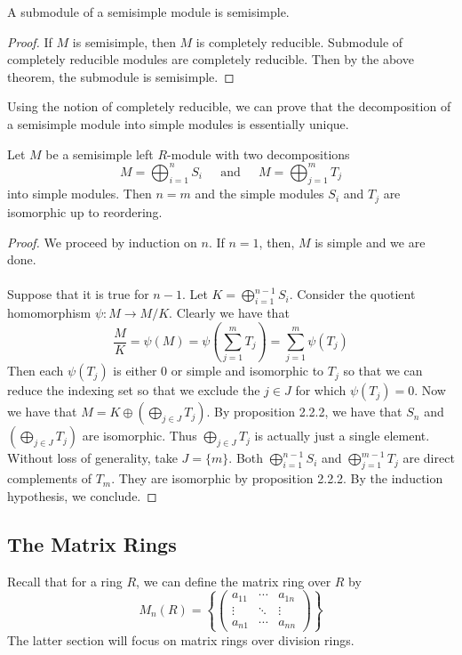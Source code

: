 \documentclass[a4paper]{article}
\begin{document}
\begin{crl}{}{} A submodule of a semisimple module is semisimple. \tcbline
\begin{proof}
If $M$ is semisimple, then $M$ is completely reducible. Submodule of completely reducible modules are completely reducible. Then by the above theorem, the submodule is semisimple. 
\end{proof}
\end{crl}

Using the notion of completely reducible, we can prove that the decomposition of a semisimple module into simple modules is essentially unique. 

\begin{prp}{}{} Let $M$ be a semisimple left $R$-module with two decompositions $$M=\bigoplus_{i=1}^nS_i\;\;\;\;\text{ and }\;\;\;\; M=\bigoplus_{j=1}^mT_j$$ into simple modules. Then $n=m$ and the simple modules $S_i$ and $T_j$ are isomorphic up to reordering. \tcbline
\begin{proof}
We proceed by induction on $n$. If $n=1$, then, $M$ is simple and we are done. \\~\\

Suppose that it is true for $n-1$. Let $K=\bigoplus_{i=1}^{n-1}S_i$. Consider the quotient homomorphism $\psi:M\to M/K$. Clearly we have that $$\frac{M}{K}=\psi(M)=\psi\left(\sum_{j=1}^mT_j\right)=\sum_{j=1}^m\psi(T_j)$$ Then each $\psi(T_j)$ is either $0$ or simple and isomorphic to $T_j$ so that we can reduce the indexing set so that we exclude the $j\in J$ for which $\psi(T_j)=0$. Now we have that $M=K\oplus\left(\bigoplus_{j\in J}T_j\right)$. By proposition 2.2.2, we have that $S_n$ and $\left(\bigoplus_{j\in J}T_j\right)$ are isomorphic. Thus $\bigoplus_{j\in J}T_j$ is actually just a single element. Without loss of generality, take $J=\{m\}$. Both $\bigoplus_{i=1}^{n-1}S_i$ and $\bigoplus_{j=1}^{m-1}T_j$ are direct complements of $T_m$. They are isomorphic by proposition 2.2.2. By the induction hypothesis, we conclude. 
\end{proof}
\end{prp}

\subsection{The Matrix Rings}
Recall that for a ring $R$, we can define the matrix ring over $R$ by $$M_n(R)=\left\{\begin{pmatrix}
a_{11} & \cdots & a_{1n}\\
\vdots & \ddots & \vdots\\
a_{n1} & \cdots & a_{nn}
\end{pmatrix}\right\}$$ The latter section will focus on matrix rings over division rings. 
\end{document}
